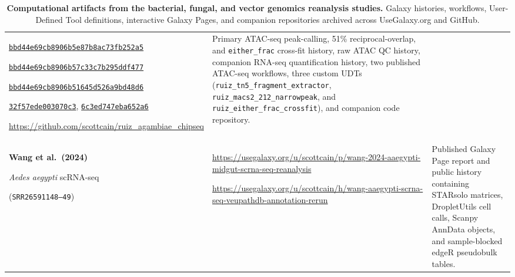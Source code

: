 \documentclass[11pt,letterpaper]{article}
\begin{document}
\begin{table}[!htbp]
\begin{tabularx}{\textwidth}{p{3.0cm}p{4.8cm}X}
\href{https://usegalaxy.org/histories/view?id=bbd44e69cb8906b5e87b8ac73fb252a5}{\texttt{bbd44e69cb8906b5e87b8ac73fb252a5}} \par
\href{https://usegalaxy.org/histories/view?id=bbd44e69cb8906b57c33c7b295ddf477}{\texttt{bbd44e69cb8906b57c33c7b295ddf477}} \par
\href{https://usegalaxy.org/histories/view?id=bbd44e69cb8906b51645d526a9bd48d6}{\texttt{bbd44e69cb8906b51645d526a9bd48d6}} \par
\href{https://usegalaxy.org/published/workflow?id=32f57ede003070c3}{\texttt{32f57ede003070c3}}, \href{https://usegalaxy.org/published/workflow?id=6c3ed747eba652a6}{\texttt{6c3ed747eba652a6}} \par
\url{https://github.com/scottcain/ruiz_agambiae_chipseq} &
Primary ATAC-seq peak-calling, 51\% reciprocal-overlap, and \texttt{either\_frac} cross-fit history, raw ATAC QC history, companion RNA-seq quantification history, two published ATAC-seq workflows, three custom UDTs (\texttt{ruiz\_tn5\_fragment\_extractor}, \texttt{ruiz\_macs2\_212\_narrowpeak}, and \texttt{ruiz\_either\_frac\_crossfit}), and companion code repository. \\
\addlinespace
\textbf{Wang et al.\ (2024)} \par \textit{Aedes aegypti} scRNA-seq \par (\texttt{SRR26591148--49}) &
\url{https://usegalaxy.org/u/scottcain/p/wang-2024-aaegypti-midgut-scrna-seq-reanalysis} \par
\url{https://usegalaxy.org/u/scottcain/h/wang-aaegypti-scrna-seq-veupathdb-annotation-rerun} &
Published Galaxy Page report and public history containing STARsolo matrices, DropletUtils cell calls, Scanpy AnnData objects, and sample-blocked edgeR pseudobulk tables. \\
\bottomrule
\end{tabularx}
\caption{\textbf{Computational artifacts from the bacterial, fungal, and vector genomics reanalysis studies.} Galaxy histories, workflows, User-Defined Tool definitions, interactive Galaxy Pages, and companion repositories archived across UseGalaxy.org and GitHub.}
\label{tab:brc_artifacts}
\end{table}

\clearpage
\end{document}
